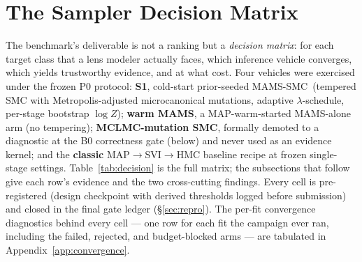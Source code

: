 
\providecommand{\sboot}{\ensuremath{\sigma_{\mathrm{boot}}}}
\providecommand{\sseed}{\ensuremath{\sigma_{\mathrm{seed}}}}
\providecommand{\logZ}{\ensuremath{\log Z}}
\providecommand{\dlogZ}{\ensuremath{\Delta\log Z}}
\providecommand{\mcsmc}{prior-seeded MAMS-SMC}

\section{The Sampler Decision Matrix}
\label{sec:matrix}

The benchmark's deliverable is not a ranking but a {\it decision matrix}: for
each target class that a lens modeler actually faces, which inference vehicle
converges, which yields trustworthy evidence, and at what cost. Four vehicles
were exercised under the frozen P0 protocol: {\bf S1}, cold-start
\mcsmc\ (tempered SMC with Metropolis-adjusted microcanonical mutations,
adaptive $\lambda$-schedule, per-stage bootstrap \logZ); {\bf warm MAMS}, a
MAP-warm-started MAMS-alone arm (no tempering); {\bf MCLMC-mutation SMC},
formally demoted to a diagnostic at the B0 correctness gate (below) and never
used as an evidence kernel; and the {\bf classic} MAP$\to$SVI$\to$HMC baseline
recipe at frozen single-stage settings. Table~\ref{tab:decision} is the full
matrix; the subsections that follow give each row's evidence and the two
cross-cutting findings. Every cell is pre-registered (design checkpoint with
derived thresholds logged before submission) and closed in the final gate
ledger (\S\ref{sec:repro}). The per-fit convergence diagnostics behind
every cell --- one row for each fit the campaign ever ran, including the
failed, rejected, and budget-blocked arms --- are tabulated in
Appendix~\ref{app:convergence}.

